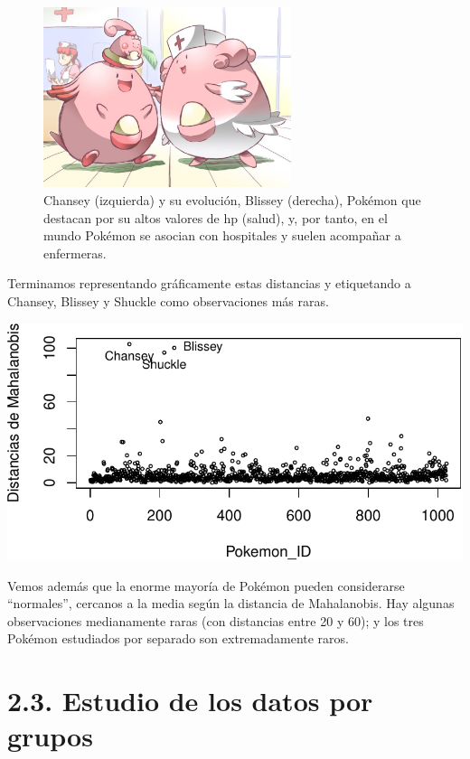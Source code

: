 \documentclass[
  12pt,
]{extreport}
\begin{document}
\begin{figure}[H]

{\centering \includegraphics[width=2.85417in,height=\textheight]{trabajo_images/chansey_blissey.jpg}

}

\caption{Chansey (izquierda) y su evolución, Blissey (derecha), Pokémon
que destacan por su altos valores de hp (salud), y, por tanto, en el
mundo Pokémon se asocian con hospitales y suelen acompañar a
enfermeras.}

\end{figure}%

Terminamos representando gráficamente estas distancias y etiquetando a
Chansey, Blissey y Shuckle como observaciones más raras.

\begin{center}
\includegraphics{trabajo_files/figure-pdf/unnamed-chunk-15-1.pdf}
\end{center}

Vemos además que la enorme mayoría de Pokémon pueden considerarse
``normales'', cercanos a la media según la distancia de Mahalanobis. Hay
algunas observaciones medianamente raras (con distancias entre 20 y 60);
y los tres Pokémon estudiados por separado son extremadamente raros.

\section{2.3. Estudio de los datos por
grupos}\label{estudio-de-los-datos-por-grupos}
\end{document}
